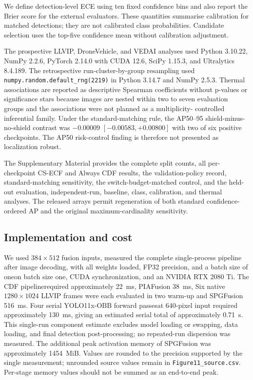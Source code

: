 \documentclass[preprint,11pt]{elsarticle}
\providecommand{\DIFaddtex}[1]{{\protect\color{blue} \sf #1}} %
\providecommand{\DIFdeltex}[1]{{\protect\color{red} \scriptsize #1}} %
\providecommand{\DIFaddbegin}{} %
\providecommand{\DIFaddend}{} %
\providecommand{\DIFdelbegin}{} %
\providecommand{\DIFdelend}{} %
\providecommand{\DIFadd}[1]{\texorpdfstring{\DIFaddtex{#1}}{#1}} %
\providecommand{\DIFdel}[1]{\texorpdfstring{\DIFdeltex{#1}}{}} %
\begin{document}
We define detection-level ECE using ten fixed confidence bins and also report
the Brier score for the external evaluators. These quantities summarise
calibration for matched detections; they are not calibrated class
probabilities. Candidate selection uses the top-five confidence mean without
calibration adjustment.

The prospective LLVIP, DroneVehicle, and VEDAI analyses used Python 3.10.22,
NumPy 2.2.6, PyTorch
2.14.0 with CUDA 12.6, SciPy 1.15.3, and Ultralytics 8.4.189. The retrospective
run-cluster-by-group resampling used
\texttt{numpy.random.default\_rng(2219)} in Python 3.14.7 and NumPy 2.5.3.
Thermal associations are reported as descriptive Spearman coefficients without
p-values or significance stars because images are nested within two to seven
evaluation groups and the associations were not planned as a multiplicity-
controlled inferential family.
Under the standard-matching rule, the AP50--95 shield-minus-no-shield contrast
was \(-0.00009\) \([-0.00583,+0.00800]\) with two of six positive checkpoints.
The AP50 risk-control finding is therefore not presented as localization
robust.

The Supplementary Material provides the complete split counts, all
per-checkpoint CS-ECF and Always CDF results, the validation-policy record,
standard-matching sensitivity, the switch-budget-matched control, and the
held-out evaluation, independent-run, baseline, class, calibration, and
thermal analyses. The released arrays permit regeneration of both standard
confidence-ordered AP and the original maximum-cardinality sensitivity.

\subsection{Implementation and cost}

We \DIFdelbegin \DIFdel{used \(384\times512\) fusion inputs, }\DIFdelend \DIFaddbegin \DIFadd{measured the complete single-process pipeline after image decoding, with
all weights loaded, }\DIFaddend FP32 precision, \DIFdelbegin \DIFdel{and a batch size of oneon }\DIFdelend \DIFaddbegin \DIFadd{batch size one, CUDA synchronization, and
}\DIFaddend an NVIDIA RTX 2080 Ti. \DIFdelbegin \DIFdel{The CDF pipelinerequired approximately
\SI{22}{ms}, PIAFusion \SI{38}{ms}, }\DIFdelend \DIFaddbegin \DIFadd{Six native \(1280\times1024\) LLVIP frames were each
evaluated in two warm-up }\DIFaddend and \DIFdelbegin \DIFdel{SPGFusion \SI{516}{ms}. Four serial
YOLO11x-OBB forward passesat 640-pixel input required approximately
\SI{130}{ms}, giving an estimated serial total of approximately \SI{0.71}{s}.
This single-run
component estimate excludes model loading or swapping, data loading, and final
detection post-processing; no repeated-run dispersion was measured. The additional peak activation memory of SPGFusion was approximately
\SI{1454}{MiB}. Values are rounded to the precision supported by the single
measurement; unrounded source values remain in
\texttt{Figure11\_source.csv}.
Per-stage memory values should not be summed as
an end-to-end peak.
}%
\end{document}
